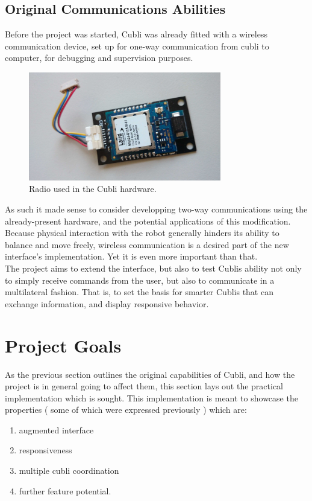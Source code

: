 \subsection{Original Communications Abilities}

Before the project was started, Cubli was already fitted with a wireless communication device, set up for one-way communication from cubli to computer, for debugging and supervision purposes.\\

\begin{figure}[ht]
   \centering
   \includegraphics[width=0.75\textwidth]{img/LAIRD-radio.jpg}
   \caption{Radio used in the Cubli hardware.}
   \label{img:LAIRD-radio}
\end{figure}

As such it made sense to consider developping two-way communications using the already-present hardware, and the potential applications of this modification.\\ 

Because physical interaction with the robot generally hinders its ability to balance and move freely, wireless communication is a desired part of the new interface's implementation.
Yet it is even more important than that.\\

The project aims to extend the interface, but also to test Cublis ability not only to simply receive commands from the user, but also to communicate in a multilateral fashion. That is, to set the basis for smarter Cublis that can exchange information, and display responsive behavior. 

\section{Project Goals}

As the previous section outlines the original capabilities of Cubli, and how the project is in general going to affect them, this section lays out the practical implementation which is sought. This implementation is meant to showcase the properties ( some of which were expressed previously ) which are:
\begin{enumerate}
\item augmented interface
\item responsiveness
\item multiple cubli coordination
\item further feature potential.
\end{enumerate}

